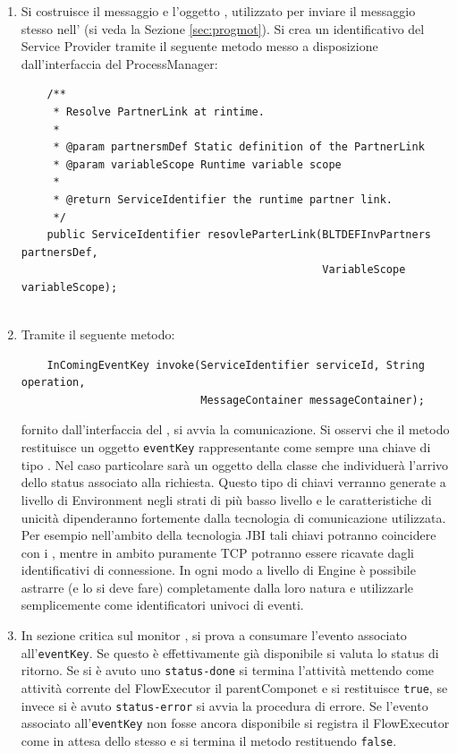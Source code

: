 \begin{enumerate}
  \item Si costruisce il messaggio e l'oggetto , 
  utilizzato per inviare il messaggio stesso nell' (si
  veda la Sezione \ref{sec:progmot}). Si crea un identificativo del Service Provider
  tramite il seguente metodo messo a disposizione dall'interfaccia del
  ProcessManager:
  \begin{lstlisting}
  	/**
     * Resolve PartnerLink at rintime.
     * 
     * @param partnersmDef Static definition of the PartnerLink
     * @param variableScope Runtime variable scope
     * 
     * @return ServiceIdentifier the runtime partner link.
     */
    public ServiceIdentifier resovleParterLink(BLTDEFInvPartners partnersDef, 
											   VariableScope variableScope);
    
  \end{lstlisting}  
  
  \item Tramite il seguente metodo: 
  \begin{lstlisting}
  	InComingEventKey invoke(ServiceIdentifier serviceId, String operation, 
							MessageContainer messageContainer);
  \end{lstlisting}
  fornito dall'interfaccia del , si avvia la
  comunicazione. Si osservi che il metodo restituisce un oggetto
  \texttt{eventKey} rappresentante come sempre una chiave di tipo . Nel caso particolare sarà un oggetto della classe
   che individuerà l'arrivo dello status
  associato alla richiesta. Questo tipo di chiavi verranno generate a livello di
  Environment negli strati di più basso livello e le caratteristiche di unicità dipenderanno fortemente dalla tecnologia di comunicazione
 utilizzata. Per esempio nell'ambito della tecnologia JBI \cite{JBI} tali chiavi
 potranno coincidere con i , mentre in ambito puramente
 TCP potranno essere ricavate dagli identificativi di connessione. In ogni modo a livello di Engine
 \`e possibile astrarre (e lo si deve fare) completamente dalla loro natura e
 utilizzarle semplicemente come identificatori univoci di eventi.
  
  \item In sezione critica sul monitor , si
  prova a consumare l'evento associato all'\texttt{eventKey}. Se questo \`e
  effettivamente già disponibile si valuta lo status di ritorno. Se si \`e
  avuto uno \texttt{status-done} si termina l'attività mettendo come
  attività corrente del FlowExecutor il parentComponet e si restituisce
  \texttt{true}, se invece si \`e avuto \texttt{status-error} si avvia la
  procedura di errore. Se l'evento associato all'\texttt{eventKey} non fosse
  ancora disponibile si registra il FlowExecutor come in attesa dello stesso e
  si termina il metodo  restituendo \texttt{false}.
  

\end{enumerate}
